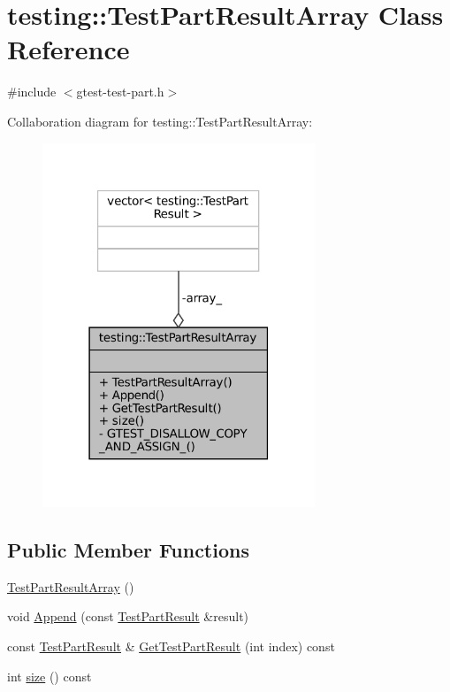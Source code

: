 \hypertarget{classtesting_1_1TestPartResultArray}{}\section{testing\+:\+:Test\+Part\+Result\+Array Class Reference}
\label{classtesting_1_1TestPartResultArray}


{\ttfamily \#include $<$gtest-\/test-\/part.\+h$>$}



Collaboration diagram for testing\+:\+:Test\+Part\+Result\+Array\+:
\nopagebreak
\begin{figure}[H]
\begin{center}
\leavevmode
\includegraphics[width=231pt]{classtesting_1_1TestPartResultArray__coll__graph}
\end{center}
\end{figure}
\subsection*{Public Member Functions}
\begin{DoxyCompactItemize}
\item 
\hyperlink{classtesting_1_1TestPartResultArray_ac9bfc830989c5328d7ff2ba8fa3c072b}{Test\+Part\+Result\+Array} ()
\item 
void \hyperlink{classtesting_1_1TestPartResultArray_a01844bd505b18a666324617a1b459558}{Append} (const \hyperlink{classtesting_1_1TestPartResult}{Test\+Part\+Result} \&result)
\item 
const \hyperlink{classtesting_1_1TestPartResult}{Test\+Part\+Result} \& \hyperlink{classtesting_1_1TestPartResultArray_aa44d02a01c87f47393b07951bab6e025}{Get\+Test\+Part\+Result} (int index) const
\item 
int \hyperlink{classtesting_1_1TestPartResultArray_a31555f11ba42b81ddad0a26a87710d0a}{size} () const
\end{DoxyCompactItemize}
